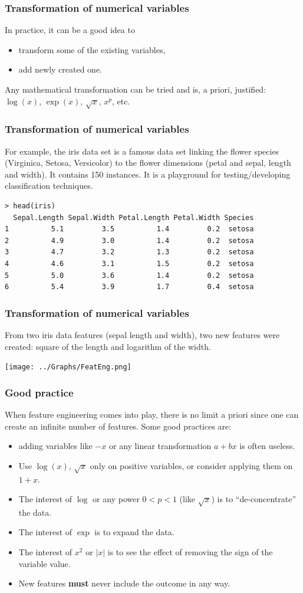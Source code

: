 \begin{frame}
\frametitle{Transformation of numerical variables}
In practice, it can be a good idea to
\begin{itemize}
\item transform some of the existing variables,
\item add newly created one.
\end{itemize}
Any mathematical transformation can be tried and is, a priori, justified: $\log(x)$, $\exp(x)$, $\sqrt{x}$, $x^p$, etc.
\end{frame}
\begin{frame}[fragile]
\frametitle{Transformation of numerical variables}
For example, the iris data set is a  famous data set linking the flower species (Virginica, Setosa, Versicolor) to the flower dimensions (petal and sepal, length and width). It contains 150 instances. It is a playground for testing/developing classification techniques.\\
\scriptsize
\begin{verbatim}
> head(iris)
  Sepal.Length Sepal.Width Petal.Length Petal.Width Species
1          5.1         3.5          1.4         0.2  setosa
2          4.9         3.0          1.4         0.2  setosa
3          4.7         3.2          1.3         0.2  setosa
4          4.6         3.1          1.5         0.2  setosa
5          5.0         3.6          1.4         0.2  setosa
6          5.4         3.9          1.7         0.4  setosa
\end{verbatim}
\normalsize
\end{frame}
\begin{frame}
\frametitle{Transformation of numerical variables}
From two iris data features (sepal length and width), two new features were created: square of the length and logarithm of the width.
\begin{center}
\texttt{[image: ../Graphs/FeatEng.png]}
\end{center}
\end{frame}
\begin{frame}
\frametitle{Good practice}
When feature engineering comes into play, there is no limit a priori since one can create an infinite number of features. Some good practices are:
\begin{itemize}
\item adding variables like $-x$ or any linear transformation $a+bx$ is often useless.
\item Use $\log(x)$, $\sqrt{x}$ only on positive variables, or consider applying them on $1+x$.
\item The interest of $\log$ or any power $0<p<1$ (like $\sqrt{x}$) is to ``de-concentrate'' the data.
\item The interest of $\exp$ is to expand the data.
\item The interest of $x^2$ or $|x|$ is to see the effect of removing the sign of the variable value.
\item New features {\bf must} never include the outcome in any way. 
\end{itemize}
\end{frame}
